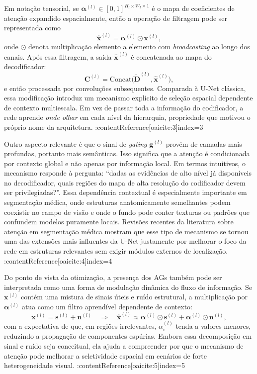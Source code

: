 \documentclass[tcc,capa]{texufpel}
\begin{document}
Em notação tensorial, se \(\boldsymbol{\alpha}^{(l)} \in [0,1]^{H_l \times W_l \times 1}\) é o mapa de coeficientes de atenção expandido espacialmente, então a operação de filtragem pode ser representada como
\begin{equation}
	\hat{\mathbf{x}}^{(l)} = \boldsymbol{\alpha}^{(l)} \odot \mathbf{x}^{(l)},
\end{equation}
onde \(\odot\) denota multiplicação elemento a elemento com \textit{broadcasting} ao longo dos canais. Após essa filtragem, a saída \(\hat{\mathbf{x}}^{(l)}\) é concatenada ao mapa do decodificador:
\begin{equation}
	\mathbf{C}^{(l)}
	=
	\mathrm{Concat}\big(\tilde{\mathbf{D}}^{(l)}, \hat{\mathbf{x}}^{(l)}\big),
\end{equation}
e então processada por convoluções subsequentes. Comparada à U-Net clássica, essa modificação introduz um mecanismo explícito de seleção espacial dependente de contexto multiescala. Em vez de passar toda a informação do codificador, a rede aprende \emph{onde olhar} em cada nível da hierarquia, propriedade que motivou o próprio nome da arquitetura. :contentReference[oaicite:3]{index=3}

Outro aspecto relevante é que o sinal de \textit{gating} \(\mathbf{g}^{(l)}\) provém de camadas mais profundas, portanto mais semânticas. Isso significa que a atenção é condicionada por contexto global e não apenas por informação local. Em termos intuitivos, o mecanismo responde à pergunta: “dadas as evidências de alto nível já disponíveis no decodificador, quais regiões do mapa de alta resolução do codificador devem ser privilegiadas?”. Essa dependência contextual é especialmente importante em segmentação médica, onde estruturas anatomicamente semelhantes podem coexistir no campo de visão e onde o fundo pode conter texturas ou padrões que confundem modelos puramente locais. Revisões recentes da literatura sobre atenção em segmentação médica mostram que esse tipo de mecanismo se tornou uma das extensões mais influentes da U-Net justamente por melhorar o foco da rede em estruturas relevantes sem exigir módulos externos de localização. :contentReference[oaicite:4]{index=4}

Do ponto de vista da otimização, a presença dos AGs também pode ser interpretada como uma forma de modulação dinâmica do fluxo de informação. Se \(\mathbf{x}^{(l)}\) contém uma mistura de sinais úteis e ruído estrutural, a multiplicação por \(\boldsymbol{\alpha}^{(l)}\) atua como um filtro aprendível dependente de contexto:
\begin{equation}
	\mathbf{x}^{(l)} = \mathbf{s}^{(l)} + \mathbf{n}^{(l)}
	\quad \Longrightarrow \quad
	\hat{\mathbf{x}}^{(l)} \approx \boldsymbol{\alpha}^{(l)} \odot \mathbf{s}^{(l)} + \boldsymbol{\alpha}^{(l)} \odot \mathbf{n}^{(l)},
\end{equation}
com a expectativa de que, em regiões irrelevantes, \(\alpha_i^{(l)}\) tenda a valores menores, reduzindo a propagação de componentes espúrias. Embora essa decomposição em sinal e ruído seja conceitual, ela ajuda a compreender por que o mecanismo de atenção pode melhorar a seletividade espacial em cenários de forte heterogeneidade visual. :contentReference[oaicite:5]{index=5}
\end{document}
